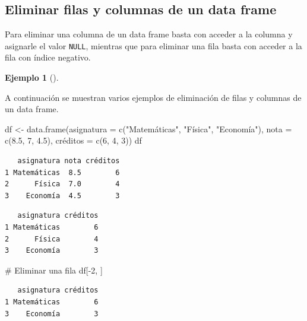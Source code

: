\documentclass[
  a4paper,
]{scrreport}
\newenvironment{Shaded}{\begin{snugshade}}{\end{snugshade}}
\newcommand{\AttributeTok}[1]{\textcolor[rgb]{0.40,0.45,0.13}{#1}}
\newcommand{\CommentTok}[1]{\textcolor[rgb]{0.37,0.37,0.37}{#1}}
\newcommand{\ConstantTok}[1]{\textcolor[rgb]{0.56,0.35,0.01}{#1}}
\newcommand{\DecValTok}[1]{\textcolor[rgb]{0.68,0.00,0.00}{#1}}
\newcommand{\FloatTok}[1]{\textcolor[rgb]{0.68,0.00,0.00}{#1}}
\newcommand{\FunctionTok}[1]{\textcolor[rgb]{0.28,0.35,0.67}{#1}}
\newcommand{\NormalTok}[1]{\textcolor[rgb]{0.00,0.23,0.31}{#1}}
\newcommand{\OtherTok}[1]{\textcolor[rgb]{0.00,0.23,0.31}{#1}}
\newcommand{\SpecialCharTok}[1]{\textcolor[rgb]{0.37,0.37,0.37}{#1}}
\newcommand{\StringTok}[1]{\textcolor[rgb]{0.13,0.47,0.30}{#1}}
\theoremstyle{definition}
\theoremstyle{definition}
\newtheorem{example}{Ejemplo}[chapter]
\theoremstyle{remark}
\begin{document}
\hypertarget{eliminar-filas-y-columnas-de-un-data-frame}{%
\subsection{Eliminar filas y columnas de un data
frame}\label{eliminar-filas-y-columnas-de-un-data-frame}}

Para eliminar una columna de un data frame basta con acceder a la
columna y asignarle el valor \texttt{NULL}, mientras que para eliminar
una fila basta con acceder a la fila con índice negativo.

\leavevmode{}%
\begin{example}[]\label{exm-eliminacion-filas-columnas-data-frame}

A continuación se muestran varios ejemplos de eliminación de filas y
columnas de un data frame.

\begin{Shaded}
\begin{Highlighting}[]
\NormalTok{df }\OtherTok{\textless{}{-}} \FunctionTok{data.frame}\NormalTok{(}\AttributeTok{asignatura =} \FunctionTok{c}\NormalTok{(}\StringTok{"Matemáticas"}\NormalTok{, }\StringTok{"Física"}\NormalTok{, }\StringTok{"Economía"}\NormalTok{), }\AttributeTok{nota =} \FunctionTok{c}\NormalTok{(}\FloatTok{8.5}\NormalTok{, }\DecValTok{7}\NormalTok{, }\FloatTok{4.5}\NormalTok{), créditos }\OtherTok{=} \FunctionTok{c}\NormalTok{(}\DecValTok{6}\NormalTok{, }\DecValTok{4}\NormalTok{, }\DecValTok{3}\NormalTok{))}
\NormalTok{df}
\end{Highlighting}
\end{Shaded}

\begin{verbatim}
   asignatura nota créditos
1 Matemáticas  8.5        6
2      Física  7.0        4
3    Economía  4.5        3
\end{verbatim}

\begin{Shaded}
\end{Shaded}

\begin{verbatim}
   asignatura créditos
1 Matemáticas        6
2      Física        4
3    Economía        3
\end{verbatim}

\begin{Shaded}
\begin{Highlighting}[]
\CommentTok{\# Eliminar una fila}
\NormalTok{df[}\SpecialCharTok{{-}}\DecValTok{2}\NormalTok{, ]}
\end{Highlighting}
\end{Shaded}

\begin{verbatim}
   asignatura créditos
1 Matemáticas        6
3    Economía        3
\end{verbatim}

\end{example}
\end{document}

